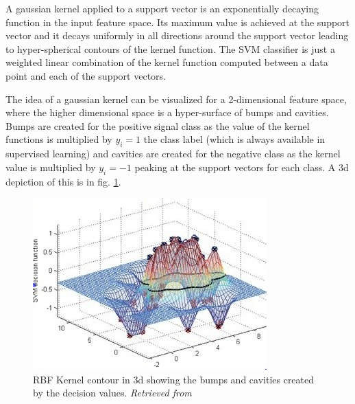 \documentclass[final,3p,times,twocolumn]{elsarticle}
\begin{document}
A gaussian kernel applied to a support vector is an exponentially decaying function in the input feature space. Its maximum value is achieved at the support vector and it decays uniformly in all directions around the support vector leading to hyper-spherical contours of the kernel function. The SVM classifier is just a weighted linear combination of the kernel function computed between a data point and each of the support vectors. 

The idea of a gaussian kernel can be visualized for a 2-dimensional feature space, where the higher dimensional space is a hyper-surface of bumps and cavities. Bumps are created for the positive signal class as the value of the kernel functions is multiplied by $y_{i} = 1$ the class label (which is always available in supervised learning) and cavities are created for the negative class as the kernel value is multiplied by $y_{i} = -1$  peaking at the support vectors for each class. A 3d depiction of this is in fig. \ref{contour}.


\begin{figure}
\hspace{-1cm}\includegraphics[scale=0.7]{Images/contour_rbf1.jpg}
\caption{RBF Kernel contour in 3d showing the bumps and cavities created by the decision values. \textit{Retrieved from \cite{RBF2}}}
\label{contour}
\end{figure}
\end{document}
